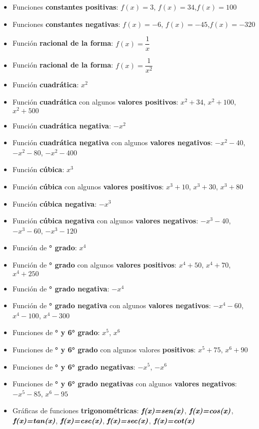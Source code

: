 \documentclass[12pt]{article}
\begin{document}
\begin{itemize}
\item Funciones \textbf{\cyan constantes positivas}: $f(x)= 3$, $f(x)= 34$,$f(x)= 100$
\item Funciones \textbf{\cyan constantes negativas}: $f(x)= - 6$, $f(x)= - 45$,$f(x)= -320$
\item Función \textbf{\cyan racional de la forma}: $f(x)=\dfrac{1}{x}$
\item Función \textbf{\cyan racional de la forma}: $f(x)=\dfrac{1}{x^2}$
\item Función \textbf{\cyan cuadrática}: $x^2$
\item Función \textbf{\cyan cuadrática} con algunos \textbf{\cyan valores positivos}: $x^2 +   34$, $x^2 + 100$, $x^2 + 500$
\item Función \textbf{\cyan cuadrática negativa}: $- x^2$
\item Función \textbf{\cyan cuadrática negativa} con algunos \textbf{\cyan valores negativos}: $- x^2 - 40 $, $-x^2 - 80 $,  $- x^2 - 400$
\item Función \textbf{\cyan cúbica}: $x^3$
\item Función \textbf{\cyan cúbica} con algunos \textbf{\cyan valores positivos}: $x^3 + 10$, $x^3 + 30$, $x^3 + 80$
\item Función \textbf{\cyan cúbica negativa}: $-x^3$
\item Función \textbf{\cyan cúbica negativa} con algunos \textbf{\cyan valores negativos}: $- x^3 - 40$, $- x^3 - 60$, $- x^3 - 120$
\item Función de \textbf{° grado}: $x^4$
\item Función de \textbf{° grado} con algunos \textbf{\cyan valores positivos}: $x^4 + 50$, $x^4 + 70$, $x^4 + 250$
\item Función de \textbf{° grado negativa}: $- x^4$
\item Función de \textbf{° grado negativa} con algunos \textbf{\cyan valores negativos}: $- x^4 - 60$, $x^4 - 100$, $x^4 - 300$
\item Funciones de \textbf{° y 6° grado}: $x^5$, $x^6$
\item Funciones de \textbf{° y 6° grado} con algunos valores \textbf{\cyan positivos}: $x^5 + 75$, $x^6 + 90$
\item Funciones de \textbf{° y 6° grado negativas}: $- x^5$, $- x^6$
\item Funciones de \textbf{° y 6° grado negativas} con algunos \textbf{\cyan valores negativos}: $- x^5 - 85$, $x^6 - 95$

\item Gráficas de funciones \textbf{\cyan trigonométricas}: $\textbf{\textit{f(x)}}\textbf{\textit{=}} \textbf{\textit{sen(x)}}$, $\textbf{\textit{f(x)}}\textbf{\textit{=}} \textbf{\textit{cos(x)}}$, $\textbf{\textit{f(x)}}\textbf{\textit{=}} \textbf{\textit{tan(x)}}$, $\textbf{\textit{f(x)}}\textbf{\textit{=}} \textbf{\textit{csc(x)}}$, $\textbf{\textit{f(x)}}\textbf{\textit{=}} \textbf{\textit{sec(x)}}$, $\textbf{\textit{f(x)}}\textbf{\textit{=}}\textbf{\textit{cot(x)}}$ \\
\end{itemize} 
\end{document}
